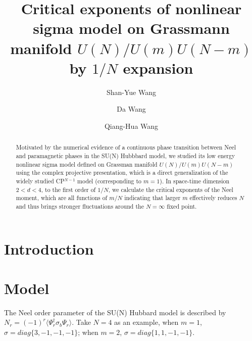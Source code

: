 \documentclass[aps,preprint,superscriptaddress]{revtex4-1}
\begin{document}
\title{Critical exponents of nonlinear sigma model on Grassmann manifold $U(N)/U(m)U(N-m)$ by $1/N$ expansion}
\author{Shan-Yue Wang}
\author{Da Wang}
\author{Qiang-Hua Wang}
\begin{abstract}
  Motivated by the numerical evidence of a continuous phase transition between Neel and paramagnetic phases in the SU(N) Hubbbard model, we studied its low energy nonlinear sigma model defined on Grassman manifold $U(N)/U(m)U(N-m)$ using the complex projective presentation, which is a direct generalization of the widely studied CP$^{N-1}$ model (corresponding to $m=1$). In space-time dimension $2<d<4$, to the first order of $1/N$, we calculate the critical exponents of the Neel moment, which are all functions of $m/N$ indicating that larger $m$ effectively reduces $N$ and thus brings stronger fluctuations around the $N=\infty$ fixed point. 
\end{abstract}
\maketitle

\section{Introduction}

\section{Model}
The Neel order parameter of the SU(N) Hubbard model is described by $N_r=(-1)^r\langle \Psi_r^\dagger \sigma_b \Psi_r\rangle$. Take $N=4$ as an example, when $m=1$, $\sigma=diag\{3,-1,-1,-1\}$; when $m=2$, $\sigma=diag\{1,1,-1,-1\}$. 
\end{document}

